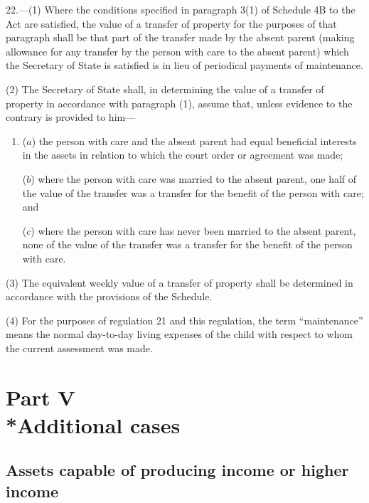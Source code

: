 \documentclass[12pt,a4paper]{article}
\begin{document}
22.—(1) Where the conditions specified in paragraph 3(1) of Schedule 4B to the Act are satisfied, the value of a transfer of property for the purposes of that paragraph shall be that part of the transfer made by the absent parent (making allowance for any transfer by the person with care to the absent parent) which the Secretary of State is satisfied is in lieu of 
periodical payments of  %
maintenance.

(2) The Secretary of State shall, in determining the value of a transfer of
property in accordance with paragraph (1), assume that, unless evidence to the
contrary is provided to him—
\begin{enumerate}\item[]
($a$) the person with care and the absent parent had equal beneficial interests in
the assets in relation to which the court order or agreement was made;

($b$) where the person with care was married to the absent parent, one half of the
value of the transfer was a transfer for the benefit of the person with care;
and

($c$) where the person with care has never been married to the absent parent, none
of the value of the transfer was a transfer for the benefit of the person with
care.
\end{enumerate}

(3) The equivalent weekly value of a transfer of property shall be determined in
accordance with the provisions of the Schedule.

(4) For the purposes of regulation 21 and this regulation, the term
“maintenance” means the normal day-to-day living expenses of the child with
respect to whom the current assessment was made.


\section[Part V --- Additional cases]{Part V\\*Additional cases}

\renewcommand\parthead{--- Part V}

\subsection[23. Assets capable of producing income or higher income]{Assets capable of producing income or higher income}
\end{document}
